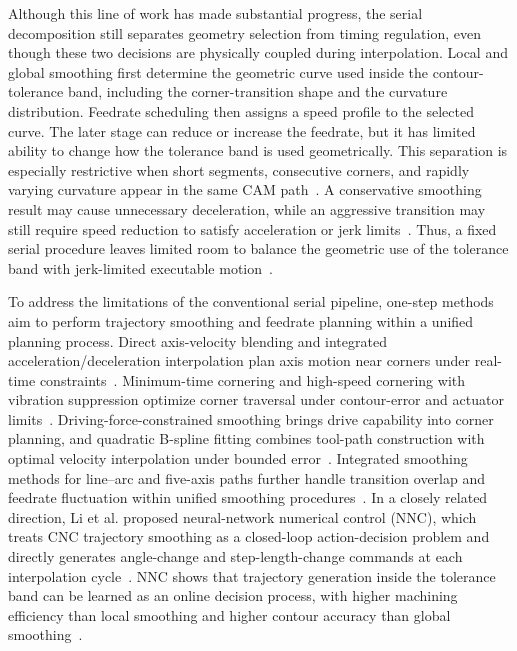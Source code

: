 \documentclass[preprint,12pt]{elsarticle}
\begin{document}
Although this line of work has made substantial progress, the serial decomposition still separates geometry selection from timing regulation, even though these two decisions are physically coupled during interpolation. Local and global smoothing first determine the geometric curve used inside the contour-tolerance band, including the corner-transition shape and the curvature distribution. Feedrate scheduling then assigns a speed profile to the selected curve. The later stage can reduce or increase the feedrate, but it has limited ability to change how the tolerance band is used geometrically. This separation is especially restrictive when short segments, consecutive corners, and rapidly varying curvature appear in the same CAM path~\cite{Li2020,Zhao2013}. A conservative smoothing result may cause unnecessary deceleration, while an aggressive transition may still require speed reduction to satisfy acceleration or jerk limits~\cite{Sencer2015,Tajima2016}. Thus, a fixed serial procedure leaves limited room to balance the geometric use of the tolerance band with jerk-limited executable motion~\cite{Sun2022,Zhang2021}.

To address the limitations of the conventional serial pipeline, one-step methods aim to perform trajectory smoothing and feedrate planning within a unified planning process. Direct axis-velocity blending and integrated acceleration/deceleration interpolation plan axis motion near corners under real-time constraints~\cite{Tajima2016,Tsai2016}. Minimum-time cornering and high-speed cornering with vibration suppression optimize corner traversal under contour-error and actuator limits~\cite{Sencer2015,Duan2016}. Driving-force-constrained smoothing brings drive capability into corner planning, and quadratic B-spline fitting combines tool-path construction with optimal velocity interpolation under bounded error~\cite{Yang2015,LiDriving2017}. Integrated smoothing methods for line--arc and five-axis paths further handle transition overlap and feedrate fluctuation within unified smoothing procedures~\cite{Li2023,Sun2024}. In a closely related direction, Li et al. proposed neural-network numerical control (NNC), which treats CNC trajectory smoothing as a closed-loop action-decision problem and directly generates angle-change and step-length-change commands at each interpolation cycle~\cite{Li2020}. NNC shows that trajectory generation inside the tolerance band can be learned as an online decision process, with higher machining efficiency than local smoothing and higher contour accuracy than global smoothing~\cite{Li2020}.
\end{document}
